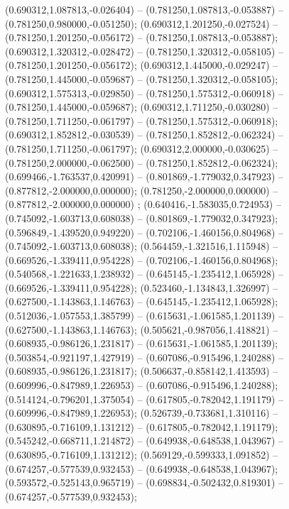  (0.690312,1.087813,-0.026404) -- (0.781250,1.087813,-0.053887) -- (0.781250,0.980000,-0.051250);
 (0.690312,1.201250,-0.027524) -- (0.781250,1.201250,-0.056172) -- (0.781250,1.087813,-0.053887);
 (0.690312,1.320312,-0.028472) -- (0.781250,1.320312,-0.058105) -- (0.781250,1.201250,-0.056172);
 (0.690312,1.445000,-0.029247) -- (0.781250,1.445000,-0.059687) -- (0.781250,1.320312,-0.058105);
 (0.690312,1.575313,-0.029850) -- (0.781250,1.575312,-0.060918) -- (0.781250,1.445000,-0.059687);
 (0.690312,1.711250,-0.030280) -- (0.781250,1.711250,-0.061797) -- (0.781250,1.575312,-0.060918);
 (0.690312,1.852812,-0.030539) -- (0.781250,1.852812,-0.062324) -- (0.781250,1.711250,-0.061797);
 (0.690312,2.000000,-0.030625) -- (0.781250,2.000000,-0.062500) -- (0.781250,1.852812,-0.062324);
 (0.699466,-1.763537,0.420991) -- (0.801869,-1.779032,0.347923) -- (0.877812,-2.000000,0.000000);
 (0.781250,-2.000000,0.000000) -- (0.877812,-2.000000,0.000000) ;
 (0.640416,-1.583035,0.724953) -- (0.745092,-1.603713,0.608038) -- (0.801869,-1.779032,0.347923);
 (0.596849,-1.439520,0.949220) -- (0.702106,-1.460156,0.804968) -- (0.745092,-1.603713,0.608038);
 (0.564459,-1.321516,1.115948) -- (0.669526,-1.339411,0.954228) -- (0.702106,-1.460156,0.804968);
 (0.540568,-1.221633,1.238932) -- (0.645145,-1.235412,1.065928) -- (0.669526,-1.339411,0.954228);
 (0.523460,-1.134843,1.326997) -- (0.627500,-1.143863,1.146763) -- (0.645145,-1.235412,1.065928);
 (0.512036,-1.057553,1.385799) -- (0.615631,-1.061585,1.201139) -- (0.627500,-1.143863,1.146763);
 (0.505621,-0.987056,1.418821) -- (0.608935,-0.986126,1.231817) -- (0.615631,-1.061585,1.201139);
 (0.503854,-0.921197,1.427919) -- (0.607086,-0.915496,1.240288) -- (0.608935,-0.986126,1.231817);
 (0.506637,-0.858142,1.413593) -- (0.609996,-0.847989,1.226953) -- (0.607086,-0.915496,1.240288);
 (0.514124,-0.796201,1.375054) -- (0.617805,-0.782042,1.191179) -- (0.609996,-0.847989,1.226953);
 (0.526739,-0.733681,1.310116) -- (0.630895,-0.716109,1.131212) -- (0.617805,-0.782042,1.191179);
 (0.545242,-0.668711,1.214872) -- (0.649938,-0.648538,1.043967) -- (0.630895,-0.716109,1.131212);
 (0.569129,-0.599333,1.091852) -- (0.674257,-0.577539,0.932453) -- (0.649938,-0.648538,1.043967);
 (0.593572,-0.525143,0.965719) -- (0.698834,-0.502432,0.819301) -- (0.674257,-0.577539,0.932453);
